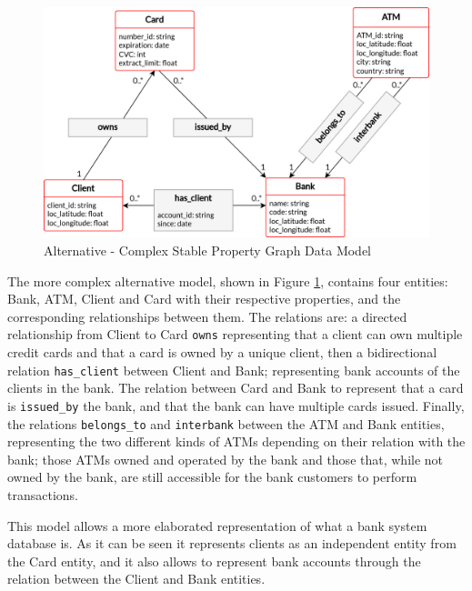 \begin{figure}[h]
  \centering
  \includegraphics[scale = 0.7]{images/1-DataModel/PG-stable-edit-cardinal.png}
  \caption{Alternative - Complex Stable Property Graph Data Model}
  \label{img:pg-stable-big}
\end{figure}


The more complex alternative model, shown in Figure \ref{img:pg-stable-big}, contains four entities: Bank, ATM, Client and Card with their respective properties, and the corresponding relationships between them. The relations are: a directed relationship from Client to Card \texttt{owns} representing that a client can own multiple credit cards and that a card is owned by a unique client, then a bidirectional relation \texttt{has\_client} between Client and Bank; representing bank accounts of the clients in the bank. The relation between Card and Bank to represent that a card is \texttt{issued\_by} the bank, and that the bank can have multiple cards issued. Finally, the relations \texttt{belongs\_to} and \texttt{interbank} between the ATM and Bank entities, representing the two different kinds of ATMs depending on their relation with the bank; those ATMs owned and operated by the bank and those that, while not owned by the bank, are still accessible for the bank customers to perform transactions.

This model allows a more elaborated representation of what a bank system database is. As it can be seen it represents clients as an independent entity from the Card entity, and it also allows to represent bank accounts through the relation between the Client and Bank entities. 

